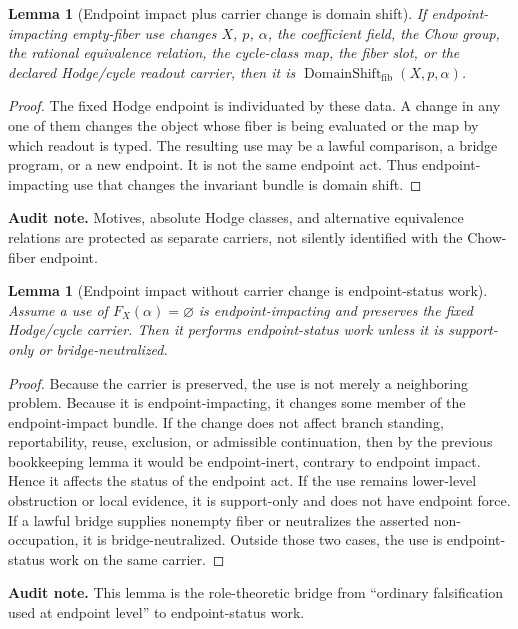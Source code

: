 \documentclass[11pt]{article}
\newtheorem{lemma}[theorem]{Lemma}
\begin{document}
\begin{lemma}[Endpoint impact plus carrier change is domain shift]
If endpoint-impacting empty-fiber use changes $X$, $p$, $\alpha$, the coefficient field, the Chow group, the rational equivalence relation, the cycle-class map, the fiber slot, or the declared Hodge/cycle readout carrier, then it is $\operatorname{DomainShift}_{\mathrm{fib}}(X,p,\alpha)$.
\end{lemma}
\begin{proof}
The fixed Hodge endpoint is individuated by these data. A change in any one of them changes the object whose fiber is being evaluated or the map by which readout is typed. The resulting use may be a lawful comparison, a bridge program, or a new endpoint. It is not the same endpoint act. Thus endpoint-impacting use that changes the invariant bundle is domain shift.
\end{proof}
\par\noindent\textbf{Audit note.} Motives, absolute Hodge classes, and alternative equivalence relations are protected as separate carriers, not silently identified with the Chow-fiber endpoint.

\begin{lemma}[Endpoint impact without carrier change is endpoint-status work]
Assume a use of $F_X(\alpha)=\varnothing$ is endpoint-impacting and preserves the fixed Hodge/cycle carrier. Then it performs endpoint-status work unless it is support-only or bridge-neutralized.
\end{lemma}
\begin{proof}
Because the carrier is preserved, the use is not merely a neighboring problem. Because it is endpoint-impacting, it changes some member of the endpoint-impact bundle. If the change does not affect branch standing, reportability, reuse, exclusion, or admissible continuation, then by the previous bookkeeping lemma it would be endpoint-inert, contrary to endpoint impact. Hence it affects the status of the endpoint act. If the use remains lower-level obstruction or local evidence, it is support-only and does not have endpoint force. If a lawful bridge supplies nonempty fiber or neutralizes the asserted non-occupation, it is bridge-neutralized. Outside those two cases, the use is endpoint-status work on the same carrier.
\end{proof}
\par\noindent\textbf{Audit note.} This lemma is the role-theoretic bridge from ``ordinary falsification used at endpoint level'' to endpoint-status work.
\end{document}
